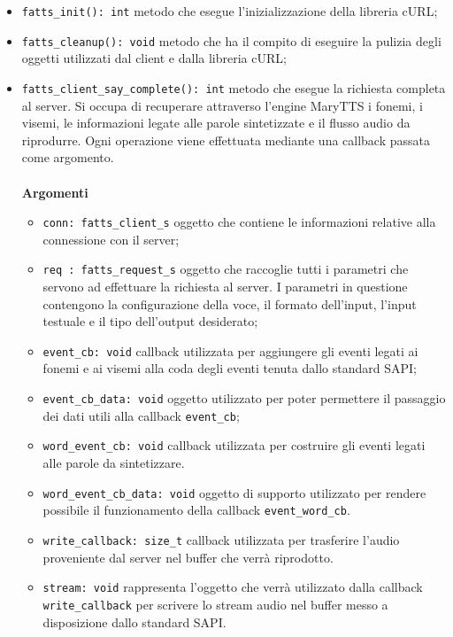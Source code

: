 	\begin{itemize}
		\item \texttt{fatts\_init(): int} metodo che esegue l'inizializzazione della libreria cURL;
		\item \texttt{fatts\_cleanup(): void} metodo che ha il compito di eseguire la pulizia degli oggetti utilizzati dal client e dalla libreria cURL;
		\item \texttt{fatts\_client\_say\_complete(): int} metodo che esegue la richiesta completa al server. Si occupa di recuperare attraverso l'engine MaryTTS i fonemi, i visemi, le informazioni legate alle parole sintetizzate e il flusso audio da riprodurre.
		Ogni operazione viene effettuata mediante una callback passata come argomento.
		\\\\
		\textbf{Argomenti}
		\begin{itemize}
			\item \texttt{conn: fatts\_client\_s} oggetto che contiene le informazioni relative alla connessione con il server;
			\item \texttt{req : fatts\_request\_s} oggetto che raccoglie tutti i parametri che servono ad effettuare la richiesta al server. I parametri in questione contengono la configurazione della voce, il formato dell'input, l'input testuale e il tipo dell'output desiderato;
			\item \texttt{event\_cb: void} callback utilizzata per aggiungere gli eventi legati ai fonemi e ai visemi alla coda degli eventi tenuta dallo standard SAPI;
			\item \texttt{event\_cb\_data: void} oggetto utilizzato per poter permettere il passaggio dei dati utili alla callback \texttt{event\_cb};
			\item \texttt{word\_event\_cb: void} callback utilizzata per costruire gli eventi legati alle parole da sintetizzare.
			\item \texttt{word\_event\_cb\_data: void} oggetto di supporto utilizzato per rendere possibile il funzionamento della callback \texttt{event\_word\_cb}.
			\item \texttt{write\_callback: size\_t} callback utilizzata per trasferire l'audio proveniente dal server nel buffer che verrà riprodotto.
			\item \texttt{stream: void} rappresenta l'oggetto che verrà utilizzato dalla callback \texttt{write\_callback} per scrivere lo stream audio nel buffer messo a disposizione dallo standard SAPI.
		\end{itemize}
	\end{itemize}

